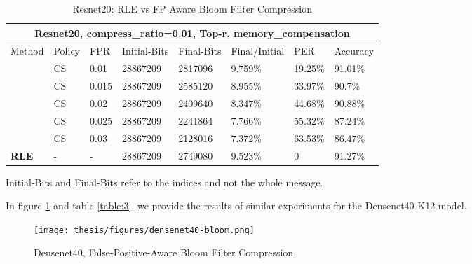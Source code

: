     \vspace{1cm}

    \begin{table}[h!]
    \footnotesize
     \centering
    \begin{tabular}{ |p{3cm}||p{1cm}|p{1cm}|p{2cm}|p{1.6cm}|p{1.6cm}|p{1.3cm}|p{1.5cm}|}
    \hline
    \multicolumn{8}{|c|}{\textbf{\footnotesize Resnet20, compress\_ratio=0.01, Top-r, memory\_compensation}} \\
    \hline
    \rule{0pt}{3ex}
    	Method & Policy & FPR  &Initial-Bits &Final-Bits &Final/Initial & PER & Accuracy\\
    \hline
    \rule{0pt}{3ex}
    \multirow{6}{*}{\textbf{Fp-Aware Bloom}}
    & CS   &0.01     &   28867209 &   2817096 &   9.759\%  &19.25\%   &91.01\%\\
    & CS   &0.015    &   28867209 &   2585120 &   8.955\%  &33.97\%   &90.7\%\\
    & CS   &0.02     &   28867209 &   2409640 &   8.347\%  &44.68\%   &90.88\%\\
    & CS   &0.025    &   28867209 &   2241864 &   7.766\%  &55.32\%   &87.24\%\\
    & CS   &0.03     &   28867209 &   2128016 &   7.372\%  &63.53\%   &86.47\%\\
    \hline
    \rule{0pt}{3ex}
    \textbf{RLE}    & - & - & 28867209 & 2749080 & 9.523\%  &0   &91.27\%\\
    \hline
    \end{tabular}
    \caption{Resnet20: RLE vs FP Aware Bloom Filter Compression}
    Initial-Bits and Final-Bits refer to the indices and not the whole message. 
    \label{table:2}
    \end{table}
    

    \newpage
    
    In figure \ref{fpa-densenet} and table \ref{table:3},
    we provide the results of similar experiments for the Densenet40-K12 model.

    \begin{figure}[h]
    \centering
    \texttt{[image: thesis/figures/densenet40-bloom.png]}
    \caption{Densenet40, False-Positive-Aware Bloom Filter Compression}
    \label{fpa-densenet}
    \end{figure}

    \vspace{1cm}


